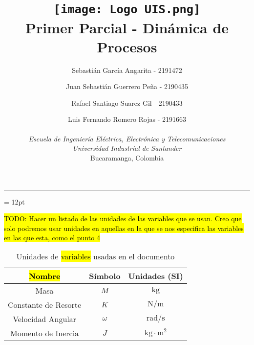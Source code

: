 \documentclass[letterpaper, 12pt]{article}
\title{\protect\vspace{-0.5cm}\protect\texttt{[image: Logo UIS.png]} \\
Primer Parcial - Dinámica de Procesos}
\author{Sebastián García Angarita - 2191472\and
        Juan Sebastián Guerrero Peña - 2190435\and
        Rafael Santiago Suarez Gil - 2190433\and
        Luis Fernando Romero Rojas - 2191663 \\ \\
        \textit{Escuela de Ingeniería Eléctrica, Electrónica y Telecomunicaciones} \\
        \textit{Universidad Industrial de Santander}\\
        Bucaramanga, Colombia \\}
\date{}
\begin{document}
\maketitle
\begin{center}\rule{0.9\linewidth}{0.5pt}\end{center}
\parskip = 12pt

\hl{TODO: Hacer un listado de las unidades de las variables que se usan. Creo que solo podremos usar unidades en aquellas en la que se nos especifica las variables en las que esta, como el punto 4}

\begin{table}[H]
\centering
\begin{tabular}{c|c|c}
    \hline
    \hl{Nombre} & Símbolo & Unidades (SI) \\
    \hline
    Masa & $M$ & $\mathrm{kg}$ \\
    Constante de Resorte & $K$ & $\mathrm{N/m}$ \\
    Velocidad Angular & $\omega$ & $\mathrm{rad/s}$ \\
    Momento de Inercia & $J$ & $\mathrm{kg\cdot m^2}$ \\
    
\end{tabular}
\caption{Unidades de \hl{variables} usadas en el documento}
\label{tab:my_label}
\end{table}
\end{document}
